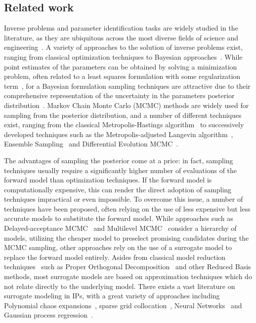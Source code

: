 \subsection{Related work}\label{sec:literature}

Inverse problems and parameter identification tasks are widely studied in the literature, as they are ubiquitous across the most diverse fields of science and engineering~\cite{KaipioSomersalo2005}.
A variety of approaches to the solution of inverse problems exist, ranging from classical optimization techniques to Bayesian approaches~\cite{Tarantola2005}.
While point estimates of the parameters can be obtained by solving a minimization problem, often related to a least squares formulation with some regularization term~\cite{EngelHankeNeubauer1996}, for a Bayesian formulation sampling techniques are attractive due to their comprehensive representation of the uncertainty in the parameters posterior distribution~\cite{Sullivan2015}.
Markov Chain Monte Carlo (MCMC) methods are widely used for sampling from the posterior distribution, and a number of different techniques exist, ranging from the classical Metropolis-Hastings algorithm~\cite{MetropolisRosenbluthRosenbluthTellerTeller1953,Hastings1970} to successively developed techniques such as the Metropolis-adjusted Langevin algorithm~\cite{RobertsTweedie1996}, Ensemble Sampling~\cite{GoodmanWeare} and Differential Evolution MCMC~\cite{TerBraak}.\medskip

The advantages of sampling the posterior come at a price: in fact, sampling techniques usually require a significantly higher number of evaluations of the forward model than optimization techniques.
If the forward model is computationally expensive, this can render the direct adoption of sampling techniques impractical or even impossible.
To overcome this issue, a number of techniques have been proposed, often relying on the use of less expensive but less accurate models to substitute the forward model.
While approaches such as Delayed-acceptance MCMC~\cite{ChristenFox2005} and Multilevel MCMC~\cite{DodwellKetelsenScheichlTeckentrup2015} consider a hierarchy of models, utilizing the cheaper model to preselect promising candidates during the MCMC sampling, other approaches rely on the use of a surrogate model to replace the forward model entirely.
Asides from classical model reduction techniques~\cite{Schilders2008} such as Proper Orthogonal Decomposition~\cite{PateraRozza2007} and other Reduced Basis methods, most surrogate models are based on approximation techniques which do not relate directly to the underlying model.
There exists a vast literature on surrogate modeling in IPs, with a great variety of approaches including Polynomial chaos expansions~\cite{MarzoukNajmRahn2007}, sparse grid collocation~\cite{XiangZabaras2009}, Neural Networks~\cite{ZhouTartakovsky2021} and Gaussian process regression~\cite{Rasmussen2003}. \medskip

